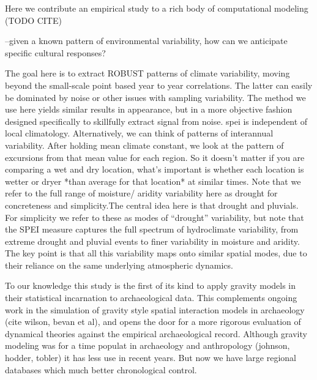 \documentclass[fleqn,10pt]{wlscirep}
\begin{document}
Here we contribute an empirical study to a rich body of computational modeling (TODO CITE)










--given a known pattern of environmental variability, how can we anticipate specific cultural responses?



 

 



The goal here is to extract ROBUST patterns of climate variability, moving beyond the small-scale point based year to year correlations. The latter can easily be dominated by noise or other issues with sampling variability. The method we use here yields similar results in appearance, but in a more objective fashion designed specifically to skillfully extract signal from noise.
spei is independent of local climatology. Alternatively, we can think of patterns of interannual variability. After holding mean climate constant, we look at the pattern of excursions from that mean value for each region. So it doesn't matter if you are comparing a wet and dry location, what's important is whether each location is wetter or dryer *than average for that location* at similar times.
Note that we refer to the full range of moisture/ aridity variability here as drought for concreteness and simplicity.The central idea here is that drought and pluvials. For simplicity we refer to these as modes of ``drought'' variability, but note that the SPEI measure captures the full spectrum of hydroclimate variability, from extreme drought and pluvial events to finer variability in moisture and aridity. The key point is that all this variability maps onto similar spatial modes, due to their reliance on the same underlying atmospheric dynamics.

To our knowledge this study is the first of its kind to apply gravity models in their statistical incarnation to archaeological data. This complements ongoing work in the simulation of gravity style spatial interaction models  in archaeology (cite wilson, bevan et al), and opens the door for a more rigorous evaluation of dynamical theories against the empirical archaeological record.
Although gravity modeling was for a time populat in archaeology and anthropology (johnson, hodder, tobler) it has less use in recent years. But now we have large regional databases which much better chronological control.
\end{document}
